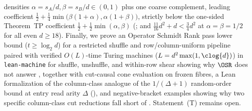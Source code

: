densities $\alpha = s_A/d, \beta = s_B/d \in (0,1)$ plus one coarse complement, leading coefficient
$\frac{1}{2} + \frac{1}{4}\min\bigl(\beta(1+\alpha), \alpha(1+\beta)\bigr)$, strictly below the
one-sided Theorem~TP coefficient $\frac{1}{2} + \frac{1}{2}\min(\alpha, \beta)$
(\cite[Theorem~6.4]{SeventeenthPaper2026}; and $\frac{11}{16}d^2 + d < \frac{3}{4}d^2$ at
$\alpha = \beta = 1/2$ for all even $d \ge 18$). Finally, we prove an Operator Schmidt Rank pass
lower bound ($t \ge \log_2 d$) for a restricted shuffle and row/column-uniform pipeline paired with
verified $O(L)$-time Turing machines ($L = d^2\max(1,\clog{d})$) in \texttt{lean-machine} for shuffle,
unshuffle, and within-row shear showing why $\OSR$ does not answer
\cite[Problem~9.5]{SeventeenthPaper2026}, together with cut-causal cone evaluation on frozen
 fibres, a Lean formalization of the column-class analogue of the
$1/(\Delta+1)$ random-order bound at entry read arity $\Delta$
(\cite[Proposition~4.14(a)--(b)]{FourthPaper2026}), and negative-bracket examples showing why two
specific column-class cut reductions fall short of \cite[Problem~9.4(b)]{SeventeenthPaper2026}.
Statement~(T) remains open.
